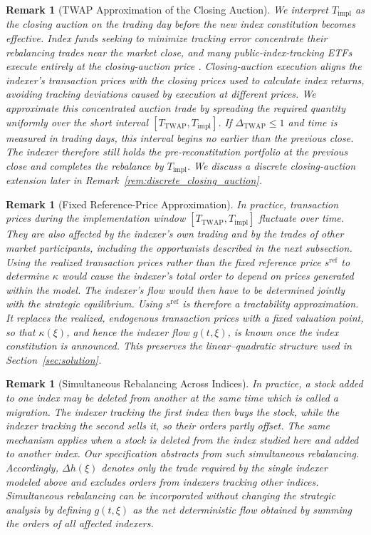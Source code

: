 \documentclass[12pt]{article}
\numberwithin{equation}{section}
\newtheorem{remark}[theorem]{Remark}
\theoremstyle{definition}
\begin{document}
\begin{remark}[TWAP Approximation of the Closing Auction]%
\label{rem:twap_approximation}
We interpret \(T_{\mathrm{impl}}\) as the closing auction on the trading day
before the new index constitution becomes effective. Index funds seeking to
minimize tracking error concentrate their rebalancing trades near the market
close, and many public-index-tracking ETFs execute entirely at the closing-auction price
\citep{Li2021,JiangWuYao2025}. Closing-auction execution aligns the indexer's
transaction prices with the closing prices used to calculate index returns,
avoiding tracking deviations caused by execution at different prices. We
approximate this concentrated auction trade by spreading the required quantity
uniformly over the short interval \([T_{\mathrm{TWAP}},T_{\mathrm{impl}}]\). If
\(\Delta_{\mathrm{TWAP}}\leq1\) and time is measured in trading days, this
interval begins no earlier than the previous close. The indexer therefore
still holds the pre-reconstitution portfolio at the previous close and
completes the rebalance by \(T_{\mathrm{impl}}\).
We discuss a discrete closing-auction extension later in
Remark~\ref{rem:discrete_closing_auction}.
\end{remark}

\begin{remark}[Fixed Reference-Price Approximation]
In practice, transaction prices during the implementation window
\([T_{\mathrm{TWAP}},T_{\mathrm{impl}}]\) fluctuate over time. They are also
affected by the indexer's own trading and by the trades of other market
participants, including the opportunists described in the next subsection.
Using the realized transaction prices rather than the fixed reference price
\(s^{\mathrm{ref}}\) to determine \(\kappa\) would cause the indexer's total
order to depend on prices generated within the model. The indexer's flow would
then have to be determined jointly with the strategic equilibrium. Using
\(s^{\mathrm{ref}}\) is therefore a tractability approximation. It replaces
the realized, endogenous transaction prices with a fixed valuation point, so
that \(\kappa(\xi)\), and hence the indexer flow \(g(t,\xi)\), is known once
the index constitution is announced. This preserves the linear--quadratic
structure used in Section~\ref{sec:solution}.
\end{remark}

\begin{remark}[Simultaneous Rebalancing Across Indices]
In practice, a stock added to one index may be deleted from another at the same
time which is called a migration. The indexer tracking the first index then buys the stock, while the
indexer tracking the second sells it, so their orders partly offset. The same
mechanism applies when a stock is deleted from the index studied here and added
to another index. Our specification abstracts from such simultaneous
rebalancing. Accordingly, \(\Delta h(\xi)\) denotes only the trade required by
the single indexer modeled above and excludes orders from indexers tracking
other indices. Simultaneous rebalancing can be incorporated without changing
the strategic analysis by defining \(g(t,\xi)\) as the net deterministic flow
obtained by summing the orders of all affected indexers.
\end{remark}
\end{document}

